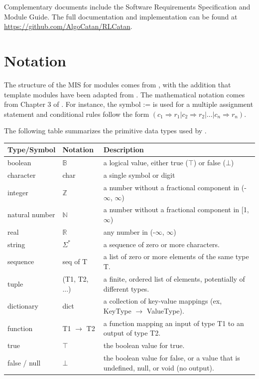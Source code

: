 \documentclass[12pt, titlepage]{article}
\begin{document}
Complementary documents include the Software Requirements Specification
and Module Guide. The full documentation and implementation can be
found at \url{https://github.com/AlgoCatan/RLCatan}.

\section{Notation}


The structure of the MIS for modules comes from \citet{HoffmanAndStrooper1995},
with the addition that template modules have been adapted from
\cite{GhezziEtAl2003}.  The mathematical notation comes from Chapter 3 of
\citet{HoffmanAndStrooper1995}.  For instance, the symbol := is used for a
multiple assignment statement and conditional rules follow the form $(c_1
\Rightarrow r_1 | c_2 \Rightarrow r_2 | ... | c_n \Rightarrow r_n )$.

The following table summarizes the primitive data types used by \progname. 

\begin{center}
  \renewcommand{\arraystretch}{1.2}
  \noindent 
  \begin{tabular}{l l p{7.5cm}} 
  \toprule 
  \textbf{Type/Symbol} & \textbf{Notation} & \textbf{Description}\\ 
  \midrule
  boolean & $\mathbb{B}$ & a logical value, either true ($\top$) or false ($\bot$) \\
  character & char & a single symbol or digit\\
  integer & $\mathbb{Z}$ & a number without a fractional component in (-$\infty$, $\infty$) \\
  natural number & $\mathbb{N}$ & a number without a fractional component in [1, $\infty$) \\
  real & $\mathbb{R}$ & any number in (-$\infty$, $\infty$)\\
  string & $\Sigma^*$ & a sequence of zero or more characters. \\
  sequence & seq of T & a list of zero or more elements of the same type T. \\
  tuple & (T1, T2, ...) & a finite, ordered list of elements, potentially of
                          different types. \\
  dictionary & dict & a collection of key-value mappings (ex, KeyType $\rightarrow$ ValueType). \\
  function & T1 $\rightarrow$ T2 & a function mapping an input of type T1 to
                          an output of type T2. \\
  true & $\top$ & the boolean value for true. \\
  false / null & $\bot$ & the boolean value for false, or a value that is
                          undefined, null, or void (no output). \\
  \bottomrule
  \end{tabular} 
  \end{center}
\end{document}
